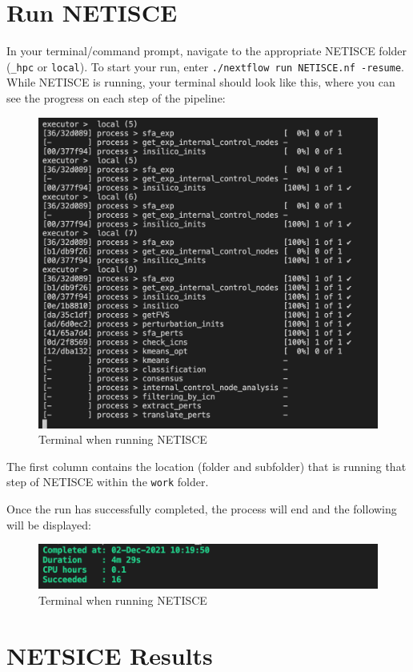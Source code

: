 \documentclass[
]{book}
\begin{document}
\hypertarget{run-netisce}{%
\section{Run NETISCE}\label{run-netisce}}

In your terminal/command prompt, navigate to the appropriate NETISCE folder (\texttt{\_hpc} or \texttt{local}). To start your run, enter \texttt{./nextflow\ run\ NETISCE.nf\ -resume}.
While NETISCE is running, your terminal should look like this, where you can see the progress on each step of the pipeline:

\begin{figure}

{\centering \includegraphics[width=0.5\linewidth]{images/running_shot} 

}

\caption{Terminal when running NETISCE}\label{fig:unnamed-chunk-7}
\end{figure}

The first column contains the location (folder and subfolder) that is running that step of NETISCE within the \texttt{work} folder.

Once the run has successfully completed, the process will end and the following will be displayed:

\begin{figure}

{\centering \includegraphics[width=0.5\linewidth]{images/completed} 

}

\caption{Terminal when running NETISCE}\label{fig:unnamed-chunk-8}
\end{figure}

\hypertarget{netsice-results}{%
\section{NETSICE Results}\label{netsice-results}}
\end{document}
